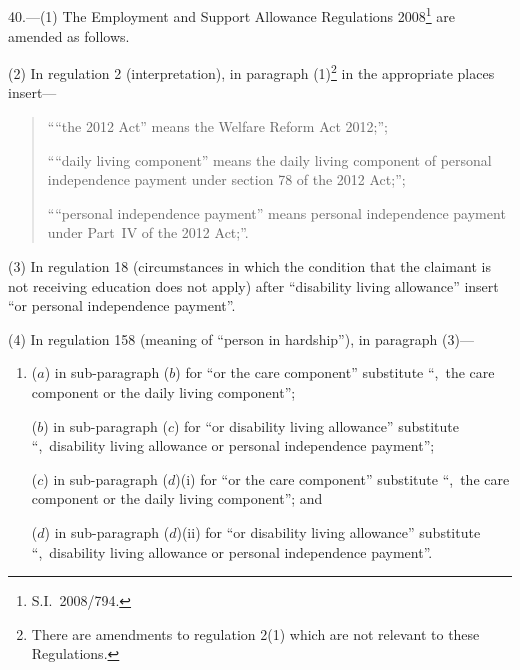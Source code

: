 \documentclass[12pt,a4paper]{article}
\begin{document}
\subsection*{\itshape{}}

40.—(1) The Employment and Support Allowance Regulations 2008\footnote{S.I.~2008/794.} are amended as follows.

(2) In regulation 2 (interpretation), in paragraph (1)\footnote{There are amendments to regulation 2(1) which are not relevant to these Regulations.} in the appropriate places insert—
\begin{quotation}
““the 2012 Act” means the Welfare Reform Act 2012;”;

““daily living component” means the daily living component of personal independence payment under section 78 of the 2012 Act;”;

““personal independence payment” means personal independence payment under Part~IV of the 2012 Act;”.
\end{quotation}

(3) In regulation 18 (circumstances in which the condition that the claimant is not receiving education does not apply) after “disability living allowance” insert “or personal independence payment”.

(4) In regulation 158 (meaning of “person in hardship”), in paragraph (3)—
\begin{enumerate}\item[]
($a$) in sub-paragraph ($b$)  for “or the care component” substitute “,~the care component or the daily living component”;

($b$) in sub-paragraph ($c$)  for “or disability living allowance” substitute “,~disability living allowance or personal independence payment”;

($c$) in sub-paragraph ($d$)(i)  for “or the care component” substitute “,~the care component or the daily living component”; and

($d$) in sub-paragraph ($d$)(ii)  for “or disability living allowance” substitute “,~disability living allowance or personal independence payment”.
\end{enumerate}
\end{document}
